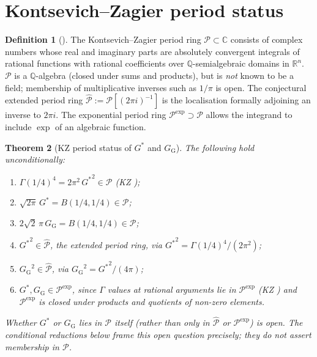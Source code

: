 \documentclass[11pt]{article}
\newtheorem{theorem}{Theorem}[section]
\theoremstyle{definition}
\newtheorem{definition}[theorem]{Definition}
\theoremstyle{remark}
\newcommand{\Gs}{G^{*}}
\newcommand{\Gss}{{G^{*}}^{2}}
\newcommand{\GG}{G_{\!\scriptscriptstyle\mathrm{G}}}
\newcommand{\Q}{\mathbb{Q}}
\newcommand{\R}{\mathbb{R}}
\newcommand{\C}{\mathbb{C}}
\begin{document}
\section{Kontsevich--Zagier period status}\label{sec:KZ}

\begin{definition}[\cite{kontsevich-zagier}]
The Kontsevich--Zagier period ring $\mathcal{P} \subset \C$ consists of
complex numbers whose real and imaginary parts are absolutely convergent
integrals of rational functions with rational coefficients over
$\Q$-semialgebraic domains in $\R^n$. $\mathcal{P}$ is a $\Q$-algebra
(closed under sums and products), but is \emph{not} known to be a field;
membership of multiplicative inverses such as $1/\pi$ is open. The
conjectural extended period ring
$\widehat{\mathcal{P}} := \mathcal{P}[(2\pi i)^{-1}]$ is the localisation
formally adjoining an inverse to $2\pi i$. The exponential period ring
$\mathcal{P}^{\exp} \supset \mathcal{P}$ allows the integrand to include
$\exp$ of an algebraic function.
\end{definition}

\begin{theorem}[KZ period status of $\Gs$ and $\GG$]\label{thm:KZ-status}
The following hold unconditionally:
\begin{enumerate}[label=\textup{(\roman*)}, leftmargin=*, itemsep=2pt]
\item $\Gamma(1/4)^4 = 2\pi^2\,\Gss \in \mathcal{P}$ (KZ \cite[\S1.1, Eq.~6]{kontsevich-zagier});
\item $\sqrt{2\pi}\,\Gs = B(1/4, 1/4) \in \mathcal{P}$;
\item $2\sqrt 2\,\pi\,\GG = B(1/4, 1/4) \in \mathcal{P}$;
\item $\Gss \in \widehat{\mathcal{P}}$, the extended period ring, via
$\Gss = \Gamma(1/4)^{4}/(2\pi^{2})$;
\item ${\GG}^2 \in \widehat{\mathcal{P}}$, via ${\GG}^{2} = \Gss/(4\pi)$;
\item $\Gs, \GG \in \mathcal{P}^{\exp}$, since $\Gamma$ values at rational
arguments lie in $\mathcal{P}^{\exp}$ (KZ \cite[\S4.3]{kontsevich-zagier})
and $\mathcal{P}^{\exp}$ is closed under products and quotients of
non-zero elements.
\end{enumerate}
Whether $\Gs$ or $\GG$ lies in $\mathcal{P}$ itself (rather than only in
$\widehat{\mathcal{P}}$ or $\mathcal{P}^{\exp}$) is open. The conditional
reductions below frame this open question precisely; they do \emph{not}
assert membership in $\mathcal{P}$.
\end{theorem}
\end{document}
